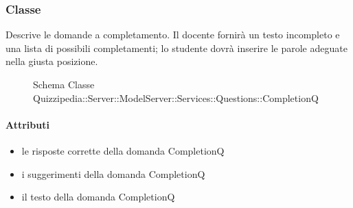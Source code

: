 \subsubsection{Classe }
Descrive le domande a completamento. Il docente fornirà un testo incompleto e una lista di possibili completamenti; lo studente dovrà inserire le parole adeguate nella giusta posizione.
\begin{figure}[H]
\centering
\noindent{}
\caption[Schema Classe CompletionQ]{Schema Classe Quizzipedia::Server::ModelServer::Services::Questions::CompletionQ}
\end{figure}
\paragraph{Attributi}
\begin{itemize}
\item {}
\newline
le risposte corrette della domanda CompletionQ
\item {}
\newline
i suggerimenti della domanda CompletionQ
\item {}
\newline
il testo della domanda CompletionQ
\end{itemize}
